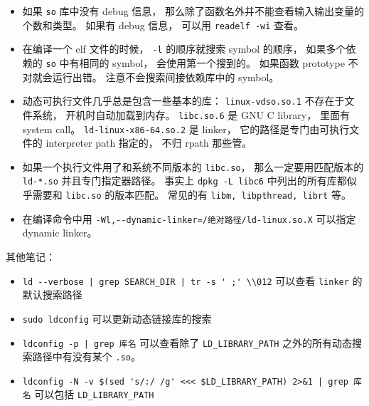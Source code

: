 \begin{itemize}
\item 如果 \verb|so| 库中没有 debug 信息， 那么除了函数名外并不能查看输入输出变量的个数和类型。 如果有 debug 信息， 可以用 \verb|readelf -wi| 查看。
\item 在编译一个 elf 文件的时候， \verb|-l| 的顺序就搜索 symbol 的顺序， 如果多个依赖的 \verb|so| 中有相同的 symbol， 会使用第一个搜到的。 如果函数 prototype 不对就会运行出错。 注意不会搜索间接依赖库中的 symbol。
\item 动态可执行文件几乎总是包含一些基本的库： \verb|linux-vdso.so.1| 不存在于文件系统， 开机时自动加载到内存。 \verb|libc.so.6| 是 GNU C library， 里面有 system call。 \verb|ld-linux-x86-64.so.2| 是 linker， 它的路径是专门由可执行文件的 interpreter path 指定的， 不归 rpath 那些管。
\item 如果一个执行文件用了和系统不同版本的 \verb|libc.so|， 那么一定要用匹配版本的 \verb|ld-*.so| 并且专门指定器路径。 事实上 \verb|dpkg -L libc6| 中列出的所有库都似乎需要和 \verb|libc.so| 的版本匹配。 常见的有 \verb|libm, libpthread, librt| 等。
\item 在编译命令中用 \verb|-Wl,--dynamic-linker=/绝对路径/ld-linux.so.X| 可以指定 dynamic linker。
\end{itemize}

其他笔记：
\begin{itemize}
\item \verb`ld --verbose | grep SEARCH_DIR | tr -s ' ;' \\012` 可以查看 \verb|linker| 的默认搜索路径
\item \verb|sudo ldconfig| 可以更新动态链接库的搜索
\item \verb`ldconfig -p | grep 库名` 可以查看除了 \verb|LD_LIBRARY_PATH| 之外的所有动态搜索路径中有没有某个 \verb|.so|。
\item \verb`ldconfig -N -v $(sed 's/:/ /g' <<< $LD_LIBRARY_PATH) 2>&1 | grep 库名` 可以包括 \verb|LD_LIBRARY_PATH|
\end{itemize}


